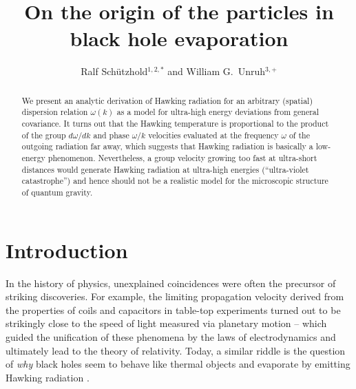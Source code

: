 \documentclass[12pt,aps,prl,showpacs,amssymb,nofootinbib,onecolumn]{revtex4-2}
\begin{document}
\title{On the origin of the particles in black hole evaporation} 

\author{Ralf Sch\"utzhold$^{1,2,*}$ and William G.~Unruh$^{3,+}$}


\begin{abstract}
\baselineskip=13.5pt
We present an analytic derivation of Hawking radiation for an
arbitrary (spatial) dispersion relation $\omega(k)$ as a model for
ultra-high energy deviations from general covariance. 
%
It turns out that the Hawking temperature is proportional to the
product of the group $d\omega/dk$ and phase $\omega/k$ velocities
evaluated at the frequency $\omega$ of the outgoing radiation far
away, which suggests that Hawking radiation is basically a low-energy
phenomenon. 
%
Nevertheless, a group velocity growing too fast at ultra-short
distances would generate Hawking radiation at ultra-high energies
(``ultra-violet catastrophe'') and hence should not be a realistic
model for the microscopic structure of quantum gravity.  
\end{abstract}

 
\maketitle

\section{Introduction}\quad
%
In the history of physics, unexplained coincidences were often the 
precursor of striking discoveries.
%
For example, the limiting propagation velocity derived from the
properties of coils and capacitors in table-top experiments turned out
to be strikingly close to the speed of light measured via planetary
motion -- which guided the unification of these phenomena by the laws
of electrodynamics and ultimately lead to the theory of relativity. 
%
Today, a similar riddle is the question of {\em why} black holes seem 
to behave like thermal objects \cite{thermo} and evaporate by emitting
Hawking radiation \cite{hawking,unruh,point}.  
\end{document}
